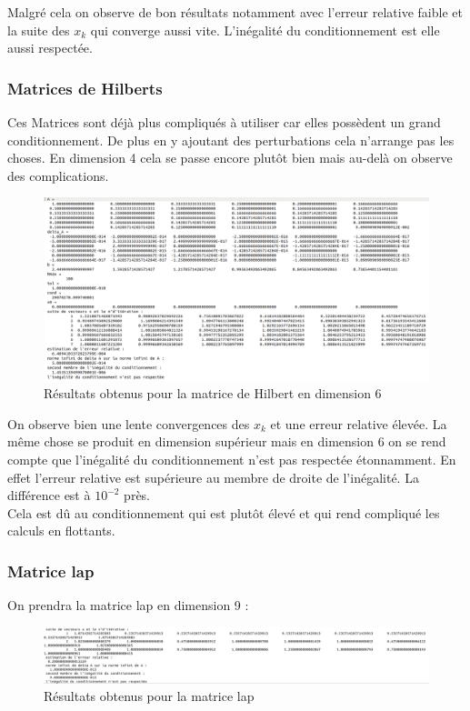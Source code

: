 \documentclass[12,french]{report}
\begin{document}
Malgré cela on observe de bon résultats notamment avec l'erreur relative faible et la suite des $x_{k}$ qui converge aussi vite. L'inégalité du conditionnement est elle aussi respectée.

\subsubsection{Matrices de Hilberts}

Ces Matrices sont déjà plus compliqués à utiliser car elles possèdent un grand conditionnement. De plus en y ajoutant des perturbations cela n'arrange pas les choses. En dimension 4 cela se passe encore plutôt bien mais au-delà on observe des complications.

\begin{figure}[H]
	\centering
	\includegraphics[width=1\textwidth]{./Images/H_6_1.res}
	\caption{Résultats obtenus pour la matrice de Hilbert en dimension 6 }
\end{figure}

On observe bien une lente convergences des $x_{k}$ et une erreur relative élevée. La même chose se produit en dimension supérieur mais en dimension 6 on se rend compte que l'inégalité du conditionnement n'est pas respectée étonnamment. En effet l'erreur relative est supérieure au membre de droite de l'inégalité. La différence est à $10^{-2}$ près.\\
Cela est dû au conditionnement qui est plutôt élevé et qui rend compliqué les calculs en flottants.

\subsubsection{Matrice lap} 

On prendra la matrice lap en dimension 9 :\\

\begin{figure}[H]
	\centering
	\includegraphics[width=1\textwidth]{./Images/lap_1.res}
	\caption{Résultats obtenus pour la matrice lap}
\end{figure}
\end{document}

